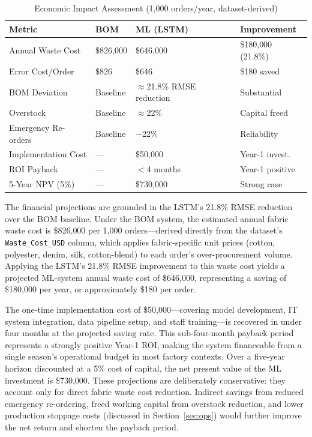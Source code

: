 \begin{table}[htbp]
\centering\caption{Economic Impact Assessment (1,000 orders/year, dataset-derived)}\label{tab:econ}
\begin{tabularx}{\textwidth}{@{}Z Y Y Z@{}}
  \toprule
  \textbf{Metric}&\textbf{BOM}&\textbf{ML (LSTM)}&\textbf{Improvement}\\
  \midrule
  Annual Waste Cost&\$826{,}000&\$646{,}000&\$180{,}000 (21.8\%)\\
  Error Cost/Order&\$826&\$646&\$180 saved\\
  BOM Deviation&Baseline&$\approx$21.8\% RMSE reduction&Substantial\\
  Overstock&Baseline&$\approx$22\%&Capital freed\\
  Emergency Re-orders&Baseline&$-$22\%&Reliability\\
  Implementation Cost&---&\$50{,}000&Year-1 invest.\\
  ROI Payback&---&$<$4 months&Year-1 positive\\
  5-Year NPV (5\%)&---&\$730{,}000&Strong case\\
  \bottomrule
\end{tabularx}
\end{table}

The financial projections are grounded in the LSTM's 21.8\% RMSE reduction over the BOM baseline. Under the BOM system, the estimated annual fabric waste cost is \$826{,}000 per 1{,}000 orders---derived directly from the dataset's \texttt{Waste\_Cost\_USD} column, which applies fabric-specific unit prices (cotton, polyester, denim, silk, cotton-blend) to each order's over-procurement volume. Applying the LSTM's 21.8\% RMSE improvement to this waste cost yields a projected ML-system annual waste cost of \$646{,}000, representing a saving of \$180{,}000 per year, or approximately \$180 per order.

The one-time implementation cost of \$50{,}000---covering model development, IT system integration, data pipeline setup, and staff training---is recovered in under four months at the projected saving rate. This sub-four-month payback period represents a strongly positive Year-1 ROI, making the system financeable from a single season's operational budget in most factory contexts. Over a five-year horizon discounted at a 5\% cost of capital, the net present value of the ML investment is \$730{,}000. These projections are deliberately conservative: they account only for direct fabric waste cost reduction. Indirect savings from reduced emergency re-ordering, freed working capital from overstock reduction, and lower production stoppage costs (discussed in Section~\ref{sec:ops}) would further improve the net return and shorten the payback period.

